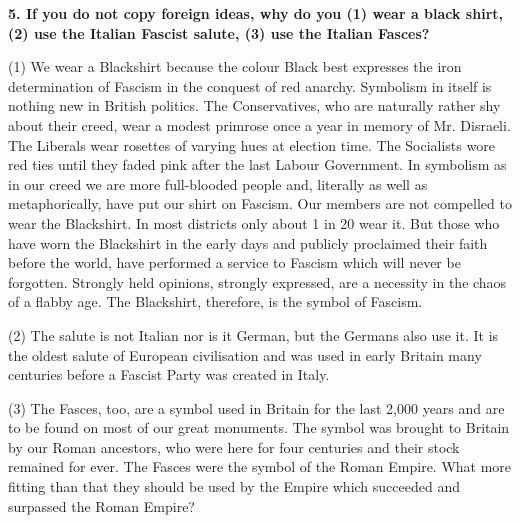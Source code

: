 \documentclass{book}
\begin{document}
\begin{flushright}
\textbf{5. If you do not copy foreign ideas, why do you (1) wear a black shirt, (2) use the Italian
    Fascist salute, (3) use the Italian Fasces?}

(1) We wear a Blackshirt because the colour Black best expresses the iron determination of
Fascism in the conquest of red anarchy. Symbolism in itself is nothing new in British politics.
The Conservatives, who are naturally rather shy about their creed, wear a modest primrose once
a year in memory of Mr. Disraeli. The Liberals wear rosettes of varying hues at election time.
The Socialists wore red ties until they faded pink after the last Labour Government. In
symbolism as in our creed we are more full-blooded people and, literally as well as
metaphorically, have put our shirt on Fascism. Our members are not compelled to wear the
Blackshirt. In most districts only about 1 in 20 wear it. But those who have worn the Blackshirt
in the early days and publicly proclaimed their faith before the world, have performed a service
to Fascism which will never be forgotten. Strongly held opinions, strongly expressed, are a
necessity in the chaos of a flabby age. The Blackshirt, therefore, is the symbol of Fascism.

(2) The salute is not Italian nor is it German, but the Germans also use it. It is the oldest salute of
European civilisation and was used in early Britain many centuries before a Fascist Party was
created in Italy.

(3) The Fasces, too, are a symbol used in Britain for the last 2,000 years and are to be found on
most of our great monuments. The symbol was brought to Britain by our Roman ancestors, who
were here for four centuries and their stock remained for ever. The Fasces were the symbol of the
Roman Empire. What more fitting than that they should be used by the Empire which succeeded and surpassed the Roman Empire?
\end{flushright}
\end{document}
